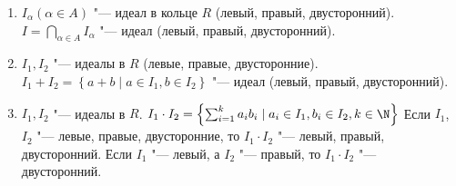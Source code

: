 \begin{enumerate}
\item
	$I_\alpha (\alpha \in A)$ "--- идеал в кольце $R$ (левый, правый, двусторонний).
	$I = \bigcap_{\alpha \in A} I_\alpha$ "--- идеал (левый, правый, двусторонний).

\item
	$I_1, I_2$ "--- идеалы в $R$ (левые, правые, двусторонние).
	$I_1 + I_2 = \left\{  a + b \mid a \in I_1, b \in I_2 \right\}$ "--- идеал (левый, правый, двусторонний).

\item
	$I_1, I_2$ "--- идеалы в $R$.
	$I_1 \cdot I_2 = \left\{ \sum_{i=1}^k a_i b_i \mid a_i \in I_1, b_i \in I_2, k \in \N \right\}$
	Если $I_1$, $I_2$ "--- левые, правые, двусторонние, то $I_1 \cdot I_2$ "--- левый, правый, двусторонний.
	Если $I_1$ "--- левый, а $I_2$ "--- правый, то $I_1 \cdot I_2$ "--- двусторонний.
\end{enumerate}

